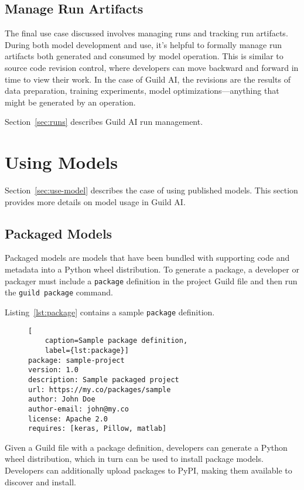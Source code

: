 \documentclass{article}
\begin{document}
\subsection{Manage Run Artifacts}

The final use case discussed involves managing runs and tracking run
artifacts. During both model development and use, it's helpful to
formally manage run artifacts both generated and consumed by model
operation. This is similar to source code revision control, where
developers can move backward and forward in time to view their
work. In the case of Guild AI, the revisions are the results of data
preparation, training experiments, model optimizations---anything that
might be generated by an operation.

Section~\ref{sec:runs} describes Guild AI run management.

\section{Using Models}

Section~\ref{sec:use-model} describes the case of using published
models. This section provides more details on model usage in Guild AI.

\subsection{Packaged Models}

Packaged models are models that have been bundled with supporting code
and metadata into a Python wheel distribution. To generate a package,
a developer or packager must include a \verb|package| definition in
the project Guild file and then run the \verb|guild package| command.

Listing~\ref{lst:package} contains a sample \verb|package| definition.

\begin{figure}
\begin{lstlisting}[
    caption=Sample package definition,
    label={lst:package}]
package: sample-project
version: 1.0
description: Sample packaged project
url: https://my.co/packages/sample
author: John Doe
author-email: john@my.co
license: Apache 2.0
requires: [keras, Pillow, matlab]
\end{lstlisting}
\end{figure}

Given a Guild file with a package definition, developers can generate
a Python wheel distribution, which in turn can be used to install
package models. Developers can additionally upload packages to PyPI,
making them available to discover and install.
\end{document}
